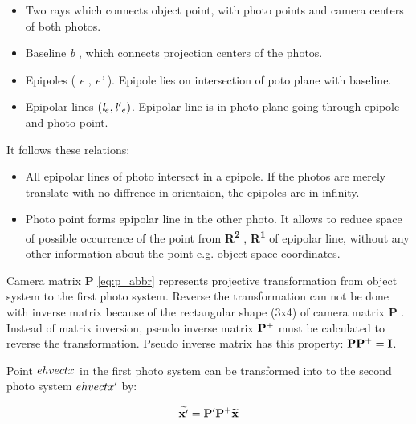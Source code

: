 \documentclass[a4paper,12pt]{article}
\newcommand{\ematr}[1]{
{\bf #1}
}
\newcommand{\ehvect}[1]{
{\bf \widetilde{#1}}
}
\newcommand{\escal}[1]{
{\it #1}
}
\newcommand{\eucl}[1]{
{\bf R\textsuperscript{#1}}
}
\begin{document}
\begin{itemize}
\item Two rays which connects object point, with photo points and camera centers of both photos.
\item Baseline \escal{b}, which connects projection centers of the photos.
\item Epipoles (\escal{e}, \escal{e'}). Epipole lies on intersection of poto plane with baseline.
\item Epipolar lines  $(\escal{l}_{e}, \escal{l'}_{e})$. Epipolar line is in photo plane going through epipole and photo point.
\end{itemize}


\noindent It follows these relations:

\begin{itemize}
\item All epipolar lines of  photo intersect in a epipole. If the photos are merely translate with no diffrence in orientaion, 
the epipoles are in infinity.
\item Photo point forms epipolar line in the other photo. It allows to reduce space of possible occurrence of the point 
      from \eucl{2}, \eucl{1} of epipolar line, without any other information about the point e.g. object space coordinates. 
\end{itemize}



Camera matrix \ematr{P} \eqref{eq:p_abbr} represents projective transformation from object system to the first photo system.
Reverse the transformation can not be done with inverse matrix because of the rectangular shape (3x4) of 
camera matrix \ematr{P}. Instead of matrix inversion,  pseudo inverse matrix $\ematr{P}^{+}$ must be 
calculated to reverse the transformation. Pseudo inverse matrix has this property: $\ematr{P}\ematr{P}^{+} = \ematr{I}$.


Point $\\ehvect{x}$ in the first photo system 
can be transformed into  
to the second photo system $\\ehvect{x'}$
by:

\begin{equation}
\ehvect{x'} =  \ematr{P'}\ematr{P}^{+}\ehvect{x}
\end{equation}
\end{document}

